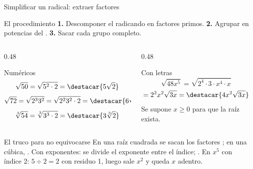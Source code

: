 \documentclass[aspectratio=169,10pt]{beamer}
\begin{document}
\begin{frame}{Simplificar un radical: extraer factores}
  \scriptsize
  \begin{block}{El procedimiento}
    \tiny
    \textbf{1.} Descomponer el radicando en factores primos. \quad
    \textbf{2.} Agrupar en potencias del . \quad
    \textbf{3.} Sacar cada grupo completo.
  \end{block}

  \vspace{0.08cm}
  \begin{columns}[T,onlytextwidth]
    \begin{column}{0.48\textwidth}
      \begin{exampleblock}{Numéricos}
        \tiny
        \[ \sqrt{50} = \sqrt{5^{2}\cdot 2} = \destacar{5\sqrt{2}} \]
        \[ \sqrt{72} = \sqrt{2^{3}3^{2}} = \sqrt{2^2 3^2 \cdot 2}
           = \destacar{6\sqrt{2}} \]
        \[ \sqrt[3]{54} = \sqrt[3]{3^{3}\cdot 2} = \destacar{3\sqrt[3]{2}} \]
      \end{exampleblock}
    \end{column}
    \begin{column}{0.48\textwidth}
      \begin{exampleblock}{Con letras}
        \tiny
        \[ \sqrt{48x^{5}} = \sqrt{2^{4}\cdot 3\cdot x^{4}\cdot x} \]
        \[ = 2^{2}x^{2}\sqrt{3x} = \destacar{4x^{2}\sqrt{3x}} \]
        {\color{uniGris} Se supone $x \ge 0$ para que la raíz exista.}
      \end{exampleblock}
    \end{column}
  \end{columns}

  \vspace{0.08cm}
  \begin{alertblock}{El truco para no equivocarse}
    \tiny
    En una raíz cuadrada se sacan los factores ; en una
    cúbica, . Con exponentes: se divide el exponente
    entre el índice; .
    En $x^5$ con índice 2: $5 \div 2 = 2$ con residuo 1, luego sale $x^2$ y
    queda $x$ adentro.
  \end{alertblock}
\end{frame}
\end{document}
